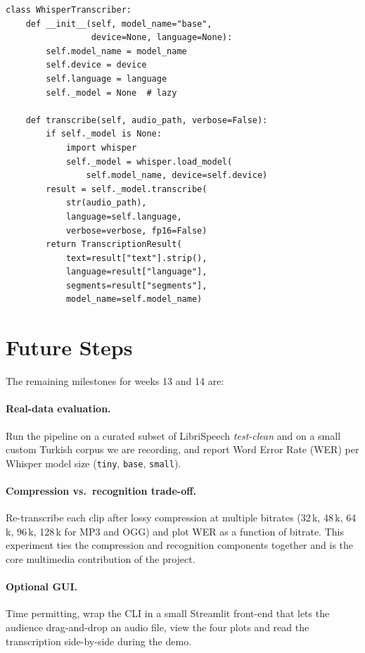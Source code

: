 \documentclass[twocolumn,10pt,a4paper]{article}
\begin{document}
\begin{lstlisting}[caption={Core of \texttt{transcriber.py} -- lazy
  model loading and a typed result.},label={lst:transcriber}]
class WhisperTranscriber:
    def __init__(self, model_name="base",
                 device=None, language=None):
        self.model_name = model_name
        self.device = device
        self.language = language
        self._model = None  # lazy

    def transcribe(self, audio_path, verbose=False):
        if self._model is None:
            import whisper
            self._model = whisper.load_model(
                self.model_name, device=self.device)
        result = self._model.transcribe(
            str(audio_path),
            language=self.language,
            verbose=verbose, fp16=False)
        return TranscriptionResult(
            text=result["text"].strip(),
            language=result["language"],
            segments=result["segments"],
            model_name=self.model_name)
\end{lstlisting}

\section{Future Steps}\label{sec:future}
The remaining milestones for weeks 13 and 14 are:

\paragraph{Real-data evaluation.}
Run the pipeline on a curated subset of LibriSpeech \emph{test-clean} and
on a small custom Turkish corpus we are recording, and report Word Error
Rate (WER) per Whisper model size (\texttt{tiny}, \texttt{base},
\texttt{small}).

\paragraph{Compression vs.\ recognition trade-off.}
Re-transcribe each clip after lossy compression at multiple bitrates
(32\,k, 48\,k, 64\,k, 96\,k, 128\,k for MP3 and OGG) and plot WER as a
function of bitrate.  This experiment ties the compression and
recognition components together and is the core multimedia
contribution of the project.

\paragraph{Optional GUI.}
Time permitting, wrap the CLI in a small Streamlit front-end that lets
the audience drag-and-drop an audio file, view the four plots and read
the transcription side-by-side during the demo.
\end{document}
